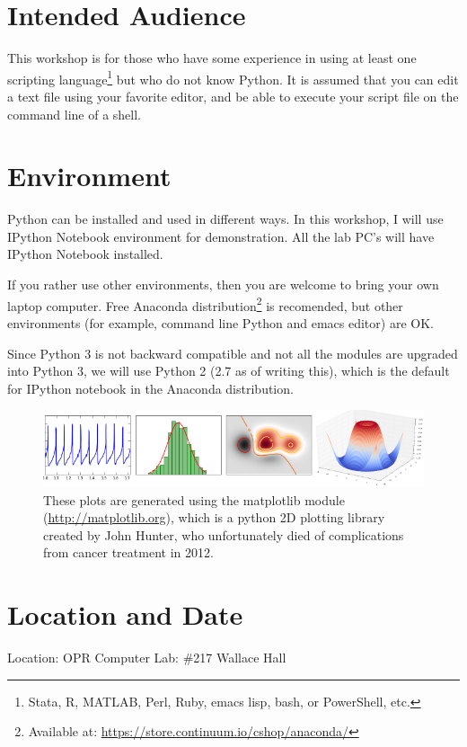\documentclass{tufte-handout}
\begin{document}
\section{Intended Audience}\label{sec:intended_audience}
This workshop is for those who have some experience in using at least
one scripting language\footnote{Stata, R, MATLAB, Perl, Ruby, emacs
lisp, bash, or PowerShell, etc.} but who do not know Python. It is
assumed that you can edit a text file using your favorite editor, and be
able to execute your script file on the command line of a shell.

\section{Environment}\label{sec:environment}
Python can be installed and used in different ways. In this workshop,
I will use IPython Notebook environment for demonstration. All the
lab PC's will have IPython Notebook installed.

If you rather use other environments, then you are welcome to bring
your own laptop computer. Free Anaconda 
distribution\footnote{Available at: 
\url{https://store.continuum.io/cshop/anaconda/}} is recomended, but
other environments (for example, command line Python and emacs editor)
are OK.

Since Python 3 is not backward compatible and not all the modules are
upgraded into Python 3, we will use Python 2 (2.7 as of writing this),
which is the default for IPython notebook in the Anaconda distribution. 

\begin{figure}[ht]
  \includegraphics[width=0.8\linewidth]{matplotlib.png}%
  \caption{These plots are generated using the matplotlib module
    (\url{http://matplotlib.org}), which is a python 2D
    plotting library created by John Hunter, who unfortunately
    died of complications from cancer treatment in 2012.}%
  \label{fig:Matplotlib Plot Examples}%
\end{figure}

\section{Location and Date}\label{sec:location_and_date}
\noindent Location: OPR Computer Lab: \#217 Wallace Hall
\end{document}
